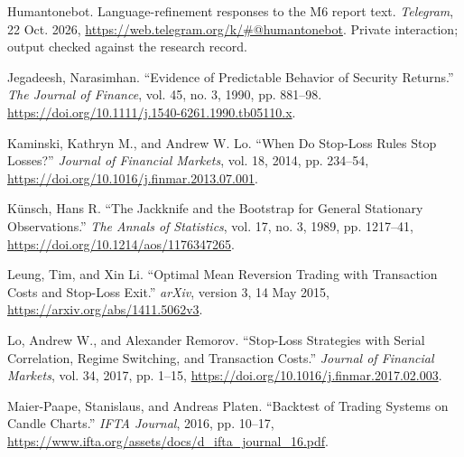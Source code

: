 \documentclass[11pt,a4paper]{article}
\begin{document}
{\RaggedRight\hangindent=1.27cm\noindent Humantonebot. Language-refinement responses to the M6 report text. \textit{Telegram}, 22 Oct. 2026, \url{https://web.telegram.org/k/\#@humantonebot}. Private interaction; output checked against the research record.\par}\vspace{5pt}

{\RaggedRight\hangindent=1.27cm\noindent Jegadeesh, Narasimhan. “Evidence of Predictable Behavior of Security Returns.” \textit{The Journal of Finance}, vol. 45, no. 3, 1990, pp. 881–98. \url{https://doi.org/10.1111/j.1540-6261.1990.tb05110.x}.\par}\vspace{5pt}

{\RaggedRight\hangindent=1.27cm\noindent Kaminski, Kathryn M., and Andrew W. Lo. “When Do Stop-Loss Rules Stop Losses?” \textit{Journal of Financial Markets}, vol. 18, 2014, pp. 234--54, \url{https://doi.org/10.1016/j.finmar.2013.07.001}.\par}\vspace{5pt}

{\RaggedRight\hangindent=1.27cm\noindent Künsch, Hans R. “The Jackknife and the Bootstrap for General Stationary Observations.” \textit{The Annals of Statistics}, vol. 17, no. 3, 1989, pp. 1217--41, \url{https://doi.org/10.1214/aos/1176347265}.\par}\vspace{5pt}

{\RaggedRight\hangindent=1.27cm\noindent Leung, Tim, and Xin Li. “Optimal Mean Reversion Trading with Transaction Costs and Stop-Loss Exit.” \textit{arXiv}, version 3, 14 May 2015, \url{https://arxiv.org/abs/1411.5062v3}.\par}\vspace{5pt}

{\RaggedRight\hangindent=1.27cm\noindent Lo, Andrew W., and Alexander Remorov. “Stop-Loss Strategies with Serial Correlation, Regime Switching, and Transaction Costs.” \textit{Journal of Financial Markets}, vol. 34, 2017, pp. 1--15, \url{https://doi.org/10.1016/j.finmar.2017.02.003}.\par}\vspace{5pt}

{\RaggedRight\hangindent=1.27cm\noindent Maier-Paape, Stanislaus, and Andreas Platen. “Backtest of Trading Systems on Candle Charts.” \textit{IFTA Journal}, 2016, pp. 10--17, \url{https://www.ifta.org/assets/docs/d_ifta_journal_16.pdf}.\par}\vspace{5pt}
\end{document}
